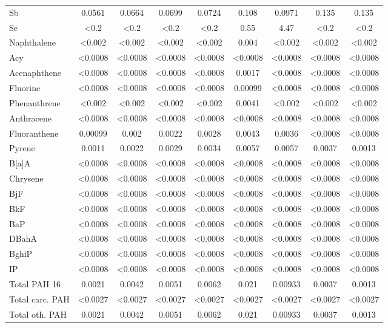 \documentclass[algorithms,article,submit,pdftex,moreauthors]{Definitions/mdpi}
\begin{document}
\begin{scriptsize}
\begin{center}
\begin{longtable}{@{\extracolsep{\fill}}|p{1.8cm}|cccccccc|@{}}
Sb & 0.0561 & 0.0664 & 0.0699 & 0.0724 & 0.108 & 0.0971 & 0.135 & 0.135 \\
Se & <0.2 & <0.2 & <0.2 & <0.2 & 0.55 & 4.47 & <0.2 & <0.2 \\
Naphthalene & <0.002 & <0.002 & <0.002 & <0.002 & 0.004 & <0.002 & <0.002 & <0.002 \\
Acy & <0.0008 & <0.0008 & <0.0008 & <0.0008 & <0.0008 & <0.0008 & <0.0008 & <0.0008 \\
Acenaphthene & <0.0008 & <0.0008 & <0.0008 & <0.0008 & 0.0017 & <0.0008 & <0.0008 & <0.0008  \\
Fluorine & <0.0008 & <0.0008 & <0.0008 & <0.0008 & 0.00099 & <0.0008 & <0.0008 & <0.0008 \\
Phenanthrene & <0.002 & <0.002 & <0.002 & <0.002 & 0.0041 & <0.002 & <0.002 & <0.002 \\
Anthracene & <0.0008 & <0.0008 & <0.0008 & <0.0008 & <0.0008 & <0.0008 & <0.0008 & <0.0008 \\
Fluoranthene & 0.00099 & 0.002 & 0.0022 & 0.0028 & 0.0043 & 0.0036 & <0.0008 & <0.0008 \\
Pyrene & 0.0011 & 0.0022 & 0.0029 & 0.0034 & 0.0057 & 0.0057 & 0.0037 & 0.0013 \\
B[a]A & <0.0008 & <0.0008 & <0.0008 & <0.0008 & <0.0008 & <0.0008 & <0.0008 & <0.0008 \\
Chrysene & <0.0008 & <0.0008 & <0.0008 & <0.0008 & <0.0008 & <0.0008 & <0.0008 & <0.0008 \\
BjF & <0.0008 & <0.0008 & <0.0008 & <0.0008 & <0.0008 & <0.0008 & <0.0008 & <0.0008 \\
BkF & <0.0008 & <0.0008 & <0.0008 & <0.0008 & <0.0008 & <0.0008 & <0.0008 & <0.0008 \\
BaP & <0.0008 & <0.0008 & <0.0008 & <0.0008 & <0.0008 & <0.0008 & <0.0008 & <0.0008 \\
DBahA & <0.0008 & <0.0008 & <0.0008 & <0.0008 & <0.0008 & <0.0008 & <0.0008 & <0.0008 \\
BghiP & <0.0008 & <0.0008 & <0.0008 & <0.0008 & <0.0008 & <0.0008 & <0.0008 & <0.0008 \\
IP & <0.0008 & <0.0008 & <0.0008 & <0.0008 & <0.0008 & <0.0008 & <0.0008 & <0.0008 \\
Total PAH 16 & 0.0021 & 0.0042 & 0.0051 & 0.0062 & 0.021 & 0.00933 & 0.0037 & 0.0013 \\
Total carc. PAH & <0.0027 & <0.0027 & <0.0027 & <0.0027 & <0.0027 & <0.0027 & <0.0027 & <0.0027 \\
Total oth. PAH & 0.0021 & 0.0042 & 0.0051 & 0.0062 & 0.021 & 0.00933 &0.0037 & 0.0013  \\

\end{longtable}
\end{center}
\end{scriptsize}
\end{document}

